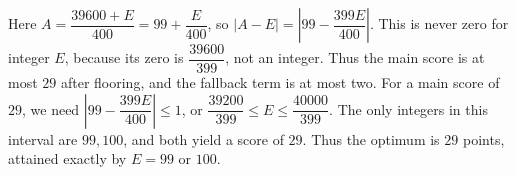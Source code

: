 Here $A=\dfrac{39600+E}{400}=99+\dfrac{E}{400}$, so $|A-E|=|99-\dfrac{399E}{400}|$. This is never zero for integer $E$, because its zero is $\dfrac{39600}{399}$, not an integer. Thus the main score is at most $29$ after flooring, and the fallback term is at most two. For a main score of $29$, we need $|99-\dfrac{399E}{400}|\le1$, or $\dfrac{39200}{399}\le E\le\dfrac{40000}{399}$. The only integers in this interval are $99,100$, and both yield a score of $29$. Thus the optimum is $\boxed{29}$ points, attained exactly by $\boxed{E=99\text{ or }100}$.
